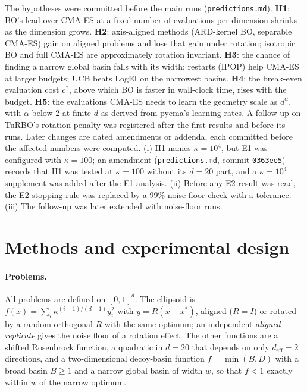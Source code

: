 \documentclass[10pt,a4paper,twocolumn]{article}
\begin{document}
The hypotheses were committed before the main runs (\texttt{predictions.md}).
\textbf{H1}: BO's lead over CMA-ES at a fixed number of evaluations per dimension shrinks as the dimension grows.
\textbf{H2}: axis-aligned methods (ARD-kernel BO, separable CMA-ES) gain on aligned problems and lose that gain under
rotation; isotropic BO and full CMA-ES are approximately rotation invariant.
\textbf{H3}: the chance of finding a narrow global basin falls with its width; restarts (IPOP) help CMA-ES at larger
budgets; UCB beats LogEI on the narrowest basins.
\textbf{H4}: the break-even evaluation cost $c^*$, above which BO is faster in wall-clock time, rises with the budget.
\textbf{H5}: the evaluations CMA-ES needs to learn the geometry scale as $d^\alpha$, with $\alpha$ below 2 at finite $d$
as derived from pycma's learning rates. A follow-up on TuRBO's rotation penalty was registered after the first results and before its runs.
Later changes are dated amendments or addenda, each committed before the affected numbers were computed.
(i) H1 names $\kappa=10^4$, but E1 was configured with $\kappa=100$; an amendment (\texttt{predictions.md},
commit \texttt{0363ee5}) records that H1 was tested at $\kappa=100$ without its $d=20$ part, and a $\kappa=10^4$ supplement was added after the E1 analysis.
(ii) Before any E2 result was read, the E2 stopping rule was replaced by a 99\% noise-floor check with a tolerance.
(iii) The follow-up was later extended with noise-floor runs.

\section{Methods and experimental design}
\paragraph{Problems.}
All problems are defined on $[0,1]^d$. The ellipsoid is $f(x)=\sum_i \kappa^{(i-1)/(d-1)} y_i^2$ with $y=R(x-x^*)$,
aligned ($R=I$) or rotated by a random orthogonal $R$ with the same optimum; an independent \emph{aligned replicate} gives
the noise floor of a rotation effect. The other functions are a shifted Rosenbrock function, a quadratic in $d=20$ that
depends on only $d_{\mathrm{eff}}=2$ directions, and a two-dimensional decoy-basin function $f=\min(B,D)$ with a broad
basin $B\geq1$ and a narrow global basin of width $w$, so that $f<1$ exactly within $w$ of the narrow optimum.
\end{document}
